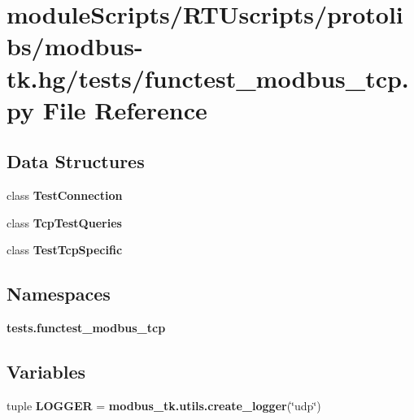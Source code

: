 \section{module\+Scripts/\+R\+T\+Uscripts/protolibs/modbus-\/tk.hg/tests/functest\+\_\+modbus\+\_\+tcp.py File Reference}
\label{functest__modbus__tcp_8py}
\subsection*{Data Structures}
\begin{DoxyCompactItemize}
\item 
class {\bf Test\+Connection}
\item 
class {\bf Tcp\+Test\+Queries}
\item 
class {\bf Test\+Tcp\+Specific}
\end{DoxyCompactItemize}
\subsection*{Namespaces}
\begin{DoxyCompactItemize}
\item 
 {\bf tests.\+functest\+\_\+modbus\+\_\+tcp}
\end{DoxyCompactItemize}
\subsection*{Variables}
\begin{DoxyCompactItemize}
\item 
tuple {\bf L\+O\+G\+G\+E\+R} = {\bf modbus\+\_\+tk.\+utils.\+create\+\_\+logger}(\char`\"{}udp\char`\"{})
\end{DoxyCompactItemize}
